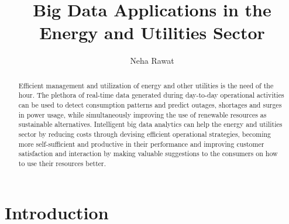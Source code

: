 \title{Big Data Applications in the Energy and Utilities Sector}


\author{Neha Rawat}



\renewcommand{\shortauthors}{N. Rawat}


\begin{abstract}
	Efficient management and utilization of energy and other utilities is the need of the hour. The plethora of real-time data generated during day-to-day operational activities can be used to detect consumption patterns and predict outages, shortages and surges in power usage, while simultaneously improving the use of renewable resources as sustainable alternatives. Intelligent big data analytics can help the energy and utilities sector by reducing costs through devising efficient operational strategies, becoming more self-sufficient and productive in their performance and improving customer satisfaction and interaction by making valuable suggestions to the consumers on how to use their resources better. 
\end{abstract}


\maketitle

\section{Introduction}

